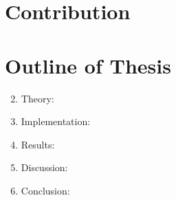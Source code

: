 

\section{Contribution}

\section{Outline of Thesis}
\begin{enumerate}
    \setcounter{enumi}{1}
    \item Theory:
    \item Implementation: 
    \item Results:
    \item Discussion: 
    \item Conclusion: 
\end{enumerate}